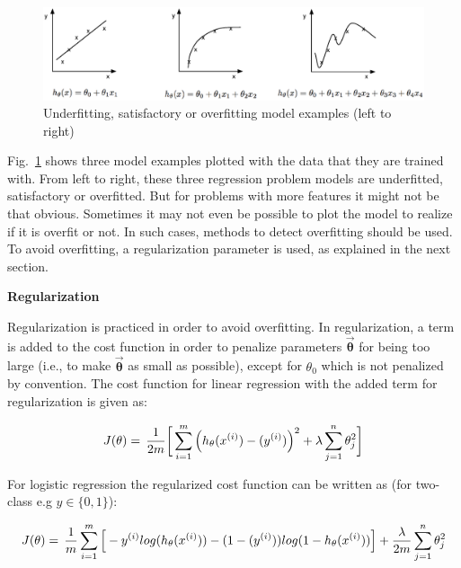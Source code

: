 \begin{figure}[H]
\begin{center}
\includegraphics[width=16cm]{figures/underOverFit}    %
\caption{Underfitting, satisfactory or overfitting model examples (left to right)} 
\label{fig:underOverFit}
\end{center}
\end{figure}

Fig.~\ref{fig:underOverFit} shows three model examples plotted with the data that they are trained with. From left to right, these three regression problem models are underfitted, satisfactory or overfitted. 
But for problems with more features it might not be that obvious. Sometimes it may not even be possible to plot the model to realize if it is overfit or not.
In such cases, methods to detect overfitting should be used. 
To avoid overfitting, a regularization parameter is used, as explained in the next section.

\textbf{Regularization}

Regularization is practiced in order to avoid overfitting.
In regularization, a term is added to the cost function in order to penalize parameters $\vec{\bm{\theta}}$ for being too large (i.e., to make $\vec{\bm{\theta}}$ as small as possible), except for ${\theta}_0$ which is not penalized by convention. The cost function for linear regression with the added term for regularization is given as:

\begin{equation}{\label{eqn:costFuncRegularized}}
J(\theta)
=\,
\frac{1}{2m} \bigg[ \sum\limits_{i=1}^{m} \Big(h_\theta(x^{(i)}) - (y^{(i)})\Big)^2 +\lambda \sum\limits_{j=1}^{n} \theta_j^2 \bigg] 
\end{equation} 

For logistic regression the regularized cost function can be written as (for two-class e.g $y \in \{0,1\}$):

\begin{equation}{\label{eqn:costFuncLogisticRegression}}
J(\theta)
=\,
\frac{1}{m} \sum\limits_{i=1}^{m} \Big[-y^{(i)}log(h_\theta(x^{(i)})) - (1-(y^{(i)}))log(1-h_\theta(x^{(i)}))\Big] +\frac{\lambda}{2m} \sum\limits_{j=1}^{n} \theta_j^2
\end{equation} 


